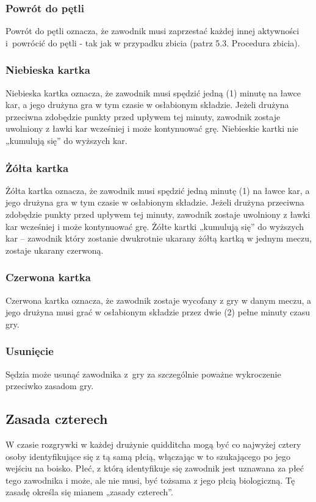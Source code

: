 \documentclass[12pt,a4paper]{article}
\begin{document}
\subsubsection{Powrót do pętli}
Powrót do pętli oznacza, że
zawodnik musi zaprzestać każdej innej aktywności i~powrócić do pętli - tak jak
w przypadku zbicia (patrz 5.3. Procedura zbicia).

\subsubsection{Niebieska kartka}
Niebieska kartka oznacza, że
zawodnik musi spędzić jedną (1) minutę na ławce kar, a jego drużyna gra w tym czasie w osłabionym składzie. Jeżeli drużyna przeciwna zdobędzie punkty przed upływem tej minuty, zawodnik zostaje uwolniony z ławki kar wcześniej i może kontynuować grę. Niebieskie kartki nie „kumulują się” do wyższych kar. 

\subsubsection{Żółta kartka}
Żółta kartka oznacza, że zawodnik musi spędzić jedną minutę (1) na ławce kar, a jego drużyna gra w tym czasie w osłabionym składzie. Jeżeli drużyna przeciwna zdobędzie punkty przed upływem tej minuty, zawodnik zostaje uwolniony z ławki kar wcześniej i może kontynuować grę. Żółte kartki „kumulują się” do wyższych kar – zawodnik który zostanie dwukrotnie ukarany żółtą kartką w jednym meczu, zostaje ukarany czerwoną.

\subsubsection{Czerwona kartka}
Czerwona kartka oznacza, że zawodnik zostaje wycofany z gry w danym meczu, a jego drużyna musi grać w osłabionym składzie przez dwie (2) pełne minuty czasu gry.

\subsubsection{Usunięcie}
Sędzia może usunąć zawodnika z~gry za
szczególnie poważne wykroczenie przeciwko zasadom gry.

\subsection{Zasada czterech}
W czasie rozgrywki w każdej drużynie quidditcha mogą być co najwyżej cztery osoby identyfikujące się z tą samą płcią, włączając w to szukającego po jego wejściu na boisko. Płeć, z którą identyfikuje się zawodnik jest uznawana za płeć tego zawodnika i może, ale nie musi, być tożsama z jego płcią biologiczną. Tę zasadę określa się mianem „zasady czterech”.
\end{document}
